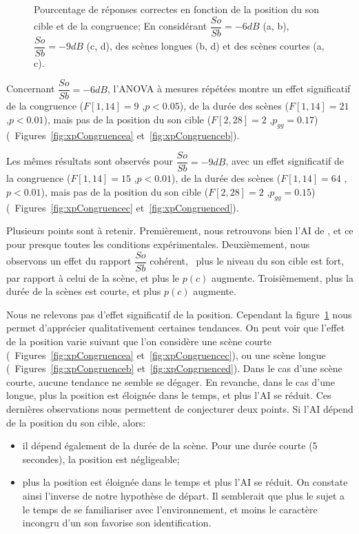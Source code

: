 \begin{figure}[t]
        \caption[Pourcentage de réponses correctes en fonction de la position du son cible et de la congruence.]{Pourcentage de réponses correctes en fonction de la position du son cible et de la congruence; En considérant $\dfrac{So}{Sb}=-6dB$ (a, b), $\dfrac{So}{Sb}=-9dB$ (c, d), des scènes longues (b, d) et des scènes courtes (a, c).}\label{fig:xpCongruence}
\end{figure}

Concernant $\dfrac{So}{Sb}=-6dB$, l'ANOVA à mesures répétées montre un effet significatif de la congruence ($F[1,14]=9$ ,$p<0.05$), de la durée des scènes ($F[1,14]=21$ ,$p<0.01$), mais pas de la position du son cible ($F[2,28]=2$ ,$p_{gg}=0.17$) (\cf~Figures~\ref{fig:xpCongruencea} et~\ref{fig:xpCongruenceb}).

Les mêmes résultats sont observés pour $\dfrac{So}{Sb}=-9dB$, avec un effet significatif de la congruence ($F[1,14]=15$ ,$p<0.01$), de la durée des scènes ($F[1,14]=64$ ,$p<0.01$), mais pas de la position du son cible ($F[2,28]=2$ ,$p_{gg}=0.15$) (\cf~Figures~\ref{fig:xpCongruencec} et~\ref{fig:xpCongruenced}).

Plusieurs points sont à retenir. Premièrement, nous retrouvons bien l'AI de \citep{gygi2011incongruency}, et ce pour presque toutes les conditions expérimentales. Deuxièmement, nous observons un effet du rapport $\dfrac{So}{Sb}$ cohérent, \ie~plus le niveau du son cible est fort, par rapport à celui de la scène, et plus le $p(c)$ augmente. Troisièmement, plus la durée de la scènes est courte, et plus $p(c)$ augmente.

Nous ne relevons pas d'effet significatif de la position. Cependant la figure~\ref{fig:xpCongruence} nous permet d'apprécier qualitativement certaines tendances. On peut voir que l'effet de la position varie suivant que l'on considère une scène courte (\cf~Figures~\ref{fig:xpCongruencea} et~\ref{fig:xpCongruencec}), ou une scène longue (\cf~Figures~\ref{fig:xpCongruenceb} et~\ref{fig:xpCongruenced}). Dans le cas d'une scène courte, aucune tendance ne semble se dégager. En revanche, dans le cas d'une longue, plus la position est éloignée dans le temps, et plus l'AI se réduit. Ces dernières observations nous permettent de conjecturer deux points. Si l'AI dépend de la position du son cible, alors:

\begin{itemize}
\item il dépend également de la durée de la scène. Pour une durée courte (5 secondes), la position est négligeable;
\item plus la position est éloignée dans le temps et plus l'AI se réduit. On constate ainsi l'inverse de notre hypothèse de départ. Il semblerait que plus le sujet a le temps de se familiariser avec l'environnement, et moins le caractère incongru d'un son favorise son identification. 
\end{itemize}